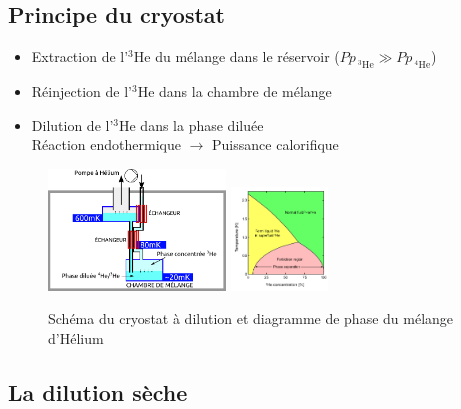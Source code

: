 \documentclass[10pt,a9paper,handout]{beamer} \usepackage[utf8]{inputenc} \usepackage[francais]{babel} \usepackage[T1]{fontenc}
\newcommand{\HeT}{$^3$He\xspace}
\begin{document}
\subsection{Principe du cryostat}
\begin{frame}
\vspace*{3mm}
\begin{itemize}
    \item Extraction de l'\HeT du mélange dans le réservoir 
        ($Pp_{\: ^3\text{He}} \gg  Pp_{\: ^4\text{He}} $)
        \vspace{2mm}
    \item Réinjection de l'\HeT dans la chambre de mélange
            \vspace{2mm}
    \item Dilution de l'\HeT dans la phase diluée\\
    Réaction endothermique $\rightarrow$ Puissance calorifique
\end{itemize}

\begin{figure}[h]
  \begin{center}
    \includegraphics[width=0.42\textwidth]{Images/Cryostat_Schema.pdf}
    \qquad
    \includegraphics[width=0.23\textwidth]{Images/Helium_phase_diagram.pdf}
    \caption{Schéma du cryostat à dilution et diagramme de phase du mélange d'Hélium}
  \end{center}
\end{figure}


\end{frame}
\subsection{La dilution sèche}
\begin{frame}
\end{frame}
\end{document}

